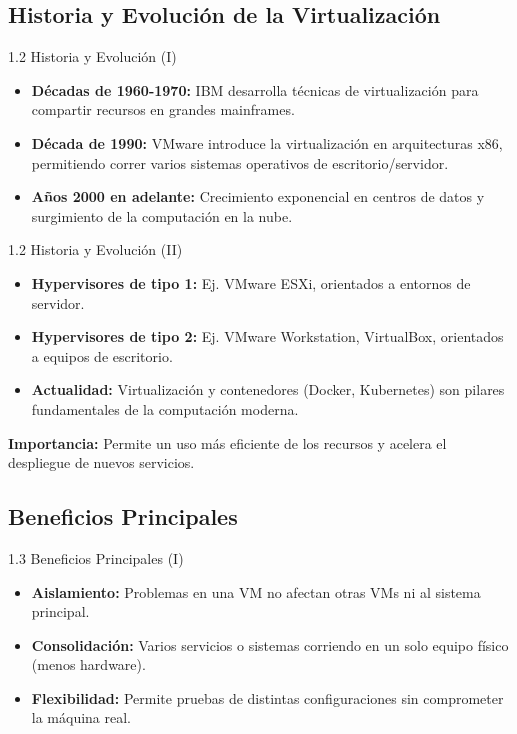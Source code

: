 \documentclass{beamer}
\begin{document}
\subsection{Historia y Evolución de la Virtualización}
\begin{frame}{1.2 Historia y Evolución (I)}
    \begin{itemize}
        \item \textbf{Décadas de 1960-1970:} IBM desarrolla técnicas de virtualización para compartir recursos en grandes mainframes.
        \item \textbf{Década de 1990:} VMware introduce la virtualización en arquitecturas x86, permitiendo correr varios sistemas operativos de escritorio/servidor.
        \item \textbf{Años 2000 en adelante:} Crecimiento exponencial en centros de datos y surgimiento de la computación en la nube.
    \end{itemize}
\end{frame}

\begin{frame}{1.2 Historia y Evolución (II)}
    \begin{itemize}
        \item \textbf{Hypervisores de tipo 1:} Ej. VMware ESXi, orientados a entornos de servidor.  
        \item \textbf{Hypervisores de tipo 2:} Ej. VMware Workstation, VirtualBox, orientados a equipos de escritorio.
        \item \textbf{Actualidad:} Virtualización y contenedores (Docker, Kubernetes) son pilares fundamentales de la computación moderna.
    \end{itemize}
    \vspace{0.3cm}
    \textbf{Importancia:} Permite un uso más eficiente de los recursos y acelera el despliegue de nuevos servicios.
\end{frame}

\subsection{Beneficios Principales}
\begin{frame}{1.3 Beneficios Principales (I)}
    \begin{itemize}
        \item \textbf{Aislamiento:} Problemas en una VM no afectan otras VMs ni al sistema principal.
        \item \textbf{Consolidación:} Varios servicios o sistemas corriendo en un solo equipo físico (menos hardware).
        \item \textbf{Flexibilidad:} Permite pruebas de distintas configuraciones sin comprometer la máquina real.
    \end{itemize}
\end{frame}
\end{document}
